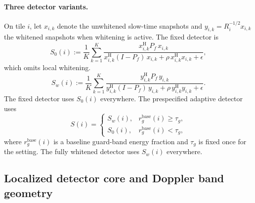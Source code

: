 \documentclass[11pt]{article}
\newcommand{\Hh}{^{\mathrm{H}}}
\newcommand{\Pf}{P_f}
\newif\ifPAPERONLY
\begin{document}
\paragraph{Three detector variants.}
On tile $i$, let $x_{i,k}$ denote the unwhitened slow-time snapshots and $y_{i,k}=R_i^{-1/2}x_{i,k}$ the whitened snapshots when whitening is active. The fixed detector is
\begin{equation}
  S_{0}(i):=\frac{1}{K}\sum_{k=1}^K
  \frac{x_{i,k}\Hh \Pf\, x_{i,k}}{x_{i,k}\Hh (I-\Pf)\, x_{i,k}+\rho\, x_{i,k}\Hh x_{i,k}+\epsilon},
  \label{eq:s0}
\end{equation}
which omits local whitening.
\begin{equation}
  S_{w}(i):=\frac{1}{K}\sum_{k=1}^K
  \frac{y_{i,k}\Hh \Pf\, y_{i,k}}{y_{i,k}\Hh (I-\Pf)\, y_{i,k}+\rho\, y_{i,k}\Hh y_{i,k}+\epsilon}.
  \label{eq:sw}
\end{equation}
The fixed detector uses $S_{0}(i)$ everywhere. The prespecified adaptive detector uses
\begin{equation}
  S(i)=
  \begin{cases}
    S_{w}(i), & r^{\mathrm{base}}_{g}(i)\ge \tau_g,\\
    S_{0}(i), & r^{\mathrm{base}}_{g}(i)<\tau_g,
  \end{cases}
  \label{eq:sadapt}
\end{equation}
where $r^{\mathrm{base}}_{g}(i)$ is a baseline guard-band energy fraction and $\tau_g$ is fixed once for the setting. The fully whitened detector uses $S_{w}(i)$ everywhere.

\ifPAPERONLY
\else
\subsection{Localized detector core and Doppler band geometry}
\end{document}
